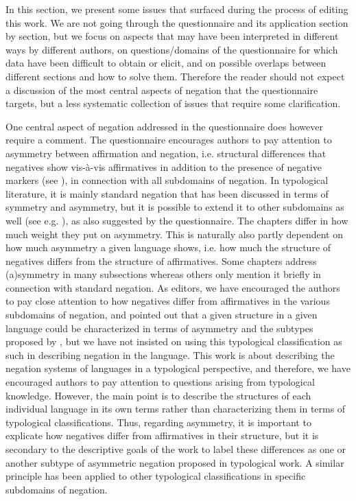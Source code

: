 \documentclass[output=paper,colorlinks,citecolor=brown]{langscibook}
\begin{document}
In this section, we present some issues that surfaced during the process of editing this work. We are not going through the questionnaire and its application section by section, but we focus on aspects that may have been interpreted in different ways by different authors, on questions\slash domains of the questionnaire for which data have been difficult to obtain or elicit, and on possible overlaps between different sections and how to solve them. Therefore the reader should not expect a discussion of the most central aspects of negation that the questionnaire targets, but a less systematic collection of issues that require some clarification. 

One central aspect of negation addressed in the questionnaire does however require a comment. The questionnaire encourages authors to pay attention to asymmetry between affirmation and negation, i.e. structural differences that negatives show vis-à-vis affirmatives in addition to the presence of negative markers (see \cite{Miestamo2005}), in connection with all subdomains of negation. In typological literature, it is mainly standard negation that has been discussed in terms of symmetry and asymmetry, but it is possible to extend it to other subdomains as well (see e.g. \cite{VanOlmen2024}), as also suggested by the questionnaire. The chapters differ in how much weight they put on asymmetry. This is naturally also partly dependent on how much asymmetry a given language shows, i.e. how much the structure of negatives differs from the structure of affirmatives. Some chapters address (a)symmetry in many subsections whereas others only mention it briefly in connection with standard negation. As editors, we have encouraged the authors to pay close attention to how negatives differ from affirmatives in the various subdomains of negation, and pointed out that a given structure in a given language could be characterized in terms of asymmetry and the subtypes proposed by \citet{Miestamo2005}, but we have not insisted on using this typological classification as such in describing negation in the language. This work is about describing the negation systems of languages in a typological perspective, and therefore, we have encouraged authors to pay attention to questions arising from typological knowledge. However, the main point is to describe the structures of each individual language in its own terms rather than characterizing them in terms of typological classifications. Thus, regarding asymmetry, it is important to explicate how negatives differ from affirmatives in their structure, but it is secondary to the descriptive goals of the work to label these differences as one or another subtype of asymmetric negation proposed in typological work. A similar principle has been applied to other typological classifications in specific subdomains of negation.
\end{document}
